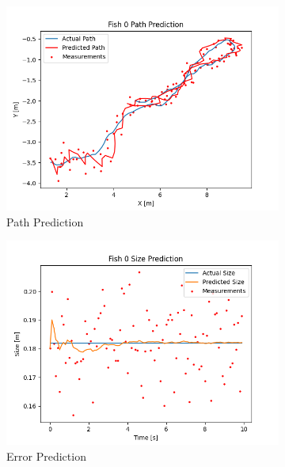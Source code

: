 \documentclass[12pt]{article}
\begin{document}
\begin{figure}[H]
    \centering
    \begin{subfigure}[b]{0.49\textwidth}
        \centering
        \includegraphics[width=\textwidth]{Problem 1/out/p1_test_fish_0_path.png}
        \caption{Path Prediction}
        \label{fig:p1-test-fish-0-path}
    \end{subfigure}
    \begin{subfigure}[b]{0.49\textwidth}
        \centering
        \includegraphics[width=\textwidth]{Problem 1/out/p1_test_fish_0_size.png}
        \caption{Error Prediction}
        \label{fig:p1-test-fish-0-size}
    \end{subfigure}
    \begin{subfigure}[b]{0.49\textwidth}

\end{subfigure}
\end{figure}
\end{document}
